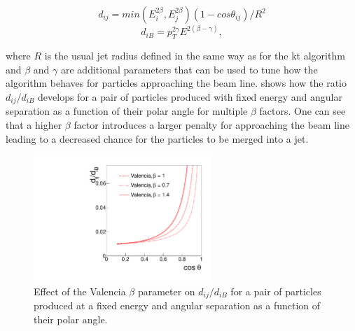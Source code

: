 \begin{equation}
d_{ij}=min(E_i^{2\beta},E_j^{2\beta})(1-cos\theta_{ij})/R^2
\end{equation}
\begin{equation}
d_{iB}=p_T^{2\gamma}E^{2(\beta - \gamma)},
\end{equation}

where $R$ is the usual jet radius defined in the same way as for the kt algorithm and $\beta$ and $\gamma$ are additional parameters that can be used to tune how the algorithm behaves for particles approaching the beam line.  shows how the ratio $d_{ij}/d_{iB}$ develops for a pair of particles produced with fixed energy and angular separation as a function of their polar angle for multiple $\beta$ factors. One can see that a higher $\beta$ factor introduces a larger penalty for approaching the beam line leading to a decreased chance for the particles to be merged into a jet.

\begin{figure}
  \centering
  \includegraphics[width=0.6\textwidth]{TopAnalysis/figures/distance_ratio_vlc.pdf}
  \caption[Effect of the Valencia $\beta$ parameter]{Effect of the Valencia $\beta$ parameter on $d_{ij}/d_{iB}$ for a pair of particles produced at a fixed energy and angular separation as a function of their polar angle\cite{Boronat:2014hva}.}
  \label{fig:valenciaPerformance}
\end{figure}

